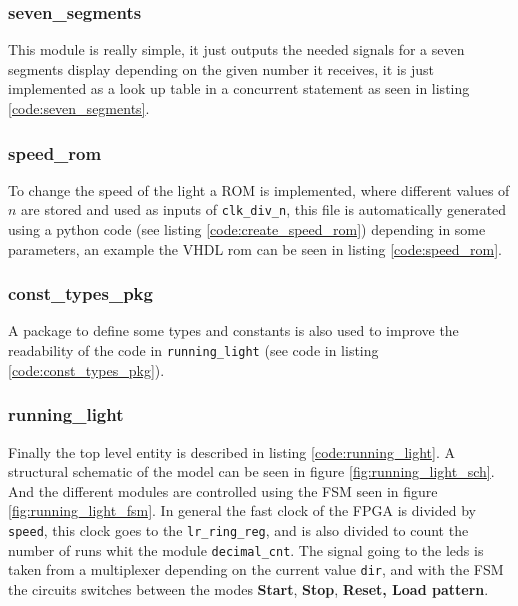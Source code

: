 \documentclass[12pt]{article}   	%
\begin{document}
\subsubsection{seven\_segments}
This module is really simple, it just outputs the needed signals for a seven segments display depending on the given number it receives, it is just implemented as a look up table in a concurrent statement as seen in listing \ref{code:seven_segments}.


\subsubsection{speed\_rom}
To change the speed of the light a ROM is implemented, where different values of $n$ are stored and used as inputs of \lstinline|clk_div_n|, this file is automatically generated using a python code (see listing \ref{code:create_speed_rom}) depending in some parameters, an example the VHDL rom can be seen in listing \ref{code:speed_rom}.

\subsubsection{const\_types\_pkg}
A package to define some types and constants is also used to improve the readability of the code in \lstinline|running_light| (see code in listing \ref{code:const_types_pkg}).

\subsubsection{running\_light}

Finally the top level entity is described in listing \ref{code:running_light}. A structural schematic of the model can be seen in figure \ref{fig:running_light_sch}. And the different modules are controlled using the FSM seen in figure \ref{fig:running_light_fsm}. In general the fast clock of the FPGA is divided by \lstinline|speed|, this clock goes to the \lstinline|lr_ring_reg|, and is also divided to count the number of runs whit the module \lstinline|decimal_cnt|. The signal going to the leds is taken from a multiplexer depending on the current value \lstinline|dir|, and with the FSM the circuits switches between the modes \textbf{Start}, \textbf{Stop}, \textbf{Reset, Load pattern}.
\end{document}
